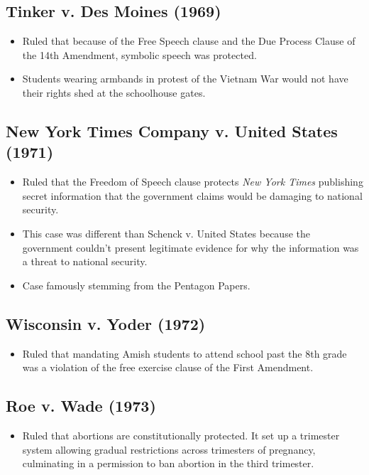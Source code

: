 \documentclass[12pt]{article}
\begin{document}
\hypertarget{Tinker}{\subsection*{Tinker v. Des Moines (1969)}}
	\begin{itemize}
		\item Ruled that because of the Free Speech clause and the Due Process Clause of the 14th Amendment, symbolic speech was protected.
		\item Students wearing armbands in protest of the Vietnam War would not have their rights shed at the schoolhouse gates.
	\end{itemize}

\hypertarget{NYT Co.}{\subsection*{New York Times Company v. United States (1971)}}
	\begin{itemize}
		\item Ruled that the Freedom of Speech clause protects \textit{New York Times} publishing secret information that the government claims would be damaging to national security.
		\item This case was different than Schenck v. United States because the government couldn't present legitimate evidence for why the information was a threat to national security.
		\item Case famously stemming from the Pentagon Papers.
	\end{itemize}

\hypertarget{Wisconsin}{\subsection*{Wisconsin v. Yoder (1972)}}
	\begin{itemize}
		\item Ruled that mandating Amish students to attend school past the 8th grade was a violation of the free exercise clause of the First Amendment.
	\end{itemize}

\hypertarget{Roe}{\subsection*{Roe v. Wade (1973)}}
	\begin{itemize}
		\item Ruled that abortions are constitutionally protected. It set up a trimester system allowing gradual restrictions across trimesters of pregnancy, culminating in a permission to ban abortion in the third trimester.
	\end{itemize}
\end{document}

